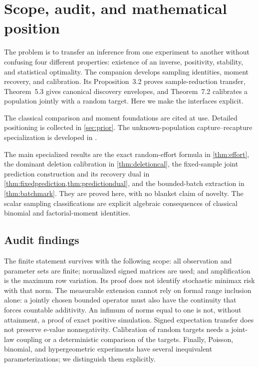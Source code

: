 \documentclass[11pt]{article}
\numberwithin{equation}{section}
\theoremstyle{definition}
\theoremstyle{remark}
\begin{document}
\section{Scope, audit, and mathematical position}\label{sec:intro}
The problem is to transfer an inference from one experiment to another without confusing four different properties: existence of an inverse, positivity, stability, and statistical optimality. The companion \cite{LongI} develops sampling identities, moment recovery, and calibration. Its Proposition~3.2 proves sample-reduction transfer, Theorem~5.3 gives canonical discovery envelopes, and Theorem~7.2 calibrates a population jointly with a random target. Here we make the interfaces explicit.

The classical comparison and moment foundations are cited at use.
Detailed positioning is collected in \cref{sec:prior}. The unknown-population
capture--recapture specialization is developed in \cite{LongCapture}.

The main specialized results are the exact random-effort formula in \cref{thm:effort}, the dominant deletion calibration in \cref{thm:deletioncal}, the fixed-sample joint prediction construction and its recovery dual in \cref{thm:fixedprediction,thm:predictiondual}, and the bounded-batch extraction in \cref{thm:batchmark}. They are proved here, with no blanket claim of novelty. The scalar sampling classifications are explicit algebraic consequences of classical binomial and factorial-moment identities.

\subsection{Audit findings}
The finite statement survives with the following scope: all observation and parameter sets are finite; normalized signed matrices are used; and amplification is the maximum row variation. Its proof does not identify stochastic minimax risk with that norm. The measurable extension cannot rely on formal range inclusion alone: a jointly chosen bounded operator must also have the continuity that forces countable additivity. An infimum of norms equal to one is not, without attainment, a proof of exact positive simulation. Signed expectation transfer does not preserve e-value nonnegativity. Calibration of random targets needs a joint-law coupling or a deterministic comparison of the targets. Finally, Poisson, binomial, and hypergeometric experiments have several inequivalent parameterizations; we distinguish them explicitly.
\end{document}
